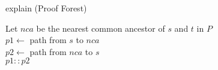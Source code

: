\begin{algorithm}[h]
\caption[.]{explain (Proof Forest)}
	
		Let $nca$ be the nearest common ancestor of $s$ and $t$ in $P$\\
		$p1 \leftarrow $ path from $s$ to $nca$ \\
		$p2 \leftarrow $ path from $nca$ to $s$ \\
		\Return $p1 :: p2$

  \label{algo:explain_pt}
\end{algorithm}


